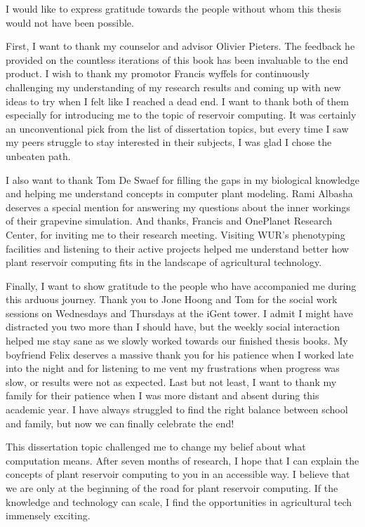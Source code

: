 
I would like to express gratitude towards the people without whom this thesis would not have been possible.

First, I want to thank my counselor and advisor Olivier Pieters. 
The feedback he provided on the countless iterations of this book has been invaluable to the end product.
I wish to thank my promotor Francis wyffels for continuously challenging my understanding of my research results and coming up with new ideas to try when I felt like I reached a dead end.
I want to thank both of them especially for introducing me to the topic of reservoir computing.
It was certainly an unconventional pick from the list of dissertation topics, 
but every time I saw my peers struggle to stay interested in their subjects, I was glad I chose the unbeaten path.

I also want to thank Tom De Swaef for filling the gaps in my biological knowledge and helping me understand concepts in computer plant modeling.
Rami Albasha deserves a special mention for answering my questions about the inner workings of their grapevine simulation.
And thanks, Francis and OnePlanet Research Center, for inviting me to their research meeting.
Visiting WUR's phenotyping facilities and listening to their active projects helped me understand better how plant reservoir computing fits in the landscape of agricultural technology.

Finally, I want to show gratitude to the people who have accompanied me during this arduous journey. 
Thank you to Jone Hoong and Tom for the social work sessions on Wednesdays and Thursdays at the iGent tower.
I admit I might have distracted you two more than I should have, but the weekly social interaction helped me stay sane as we slowly worked towards our finished thesis books.
My boyfriend Felix deserves a massive thank you for his patience when I worked late into the night and for listening to me vent my frustrations when progress was slow, or results were not as expected.
Last but not least, I want to thank my family for their patience when I was more distant and absent during this academic year.
I have always struggled to find the right balance between school and family, but now we can finally celebrate the end!


\vspace{0.5cm}

This dissertation topic challenged me to change my belief about what computation means.
After seven months of research, I hope that I can explain the concepts of plant reservoir computing to you in an accessible way. 
I believe that we are only at the beginning of the road for plant reservoir computing.
If the knowledge and technology can scale, I find the opportunities in agricultural tech immensely exciting.

